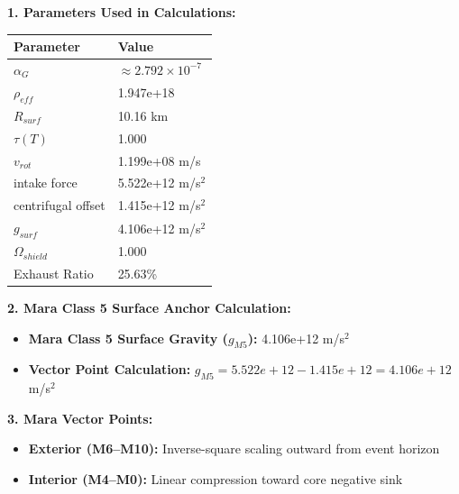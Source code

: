 \documentclass[11pt, a4paper]{article}
\begin{document}
\vspace{0.5em}
\noindent \textbf{1. Parameters Used in Calculations:}
\begin{center}
  \begin{tabular}{|l|l|}
    \hline
    \textbf{Parameter} & \textbf{Value} \\ \hline
    $\alpha_G$ & $\approx 2.792 \times 10^{-7}$ \\ \hline
    $\rho_{eff}$ & 1.947e+18 \\ \hline
    $R_{surf}$ & 10.16 km \\ \hline
    $\tau(T)$ & 1.000 \\ \hline
    $v_{rot}$ & 1.199e+08 m/s \\ \hline
    intake force & 5.522e+12 m/s$^2$ \\ \hline
    centrifugal offset & 1.415e+12 m/s$^2$ \\ \hline
    $g_{surf}$ & 4.106e+12 m/s$^2$ \\ \hline
    $\Omega_{shield}$ & 1.000 \\ \hline
    Exhaust Ratio & 25.63\% \\ \hline
  \end{tabular}
\end{center}

\vspace{0.5em}
\noindent \textbf{2. Mara Class 5 Surface Anchor Calculation:}
\begin{itemize}
  \item \textbf{Mara Class 5 Surface Gravity ($g_{M5}$):} 4.106e+12 m/s$^2$
  \item \textbf{Vector Point Calculation:} $g_{M5} = 5.522e+12 - 1.415e+12 = 4.106e+12$ m/s$^2$
\end{itemize}

\vspace{0.5em}
\noindent \textbf{3. Mara Vector Points:}
\begin{itemize}
  \item \textbf{Exterior (M6--M10):} Inverse-square scaling outward from event horizon
  \item \textbf{Interior (M4--M0):} Linear compression toward core negative sink
\end{itemize}
\end{document}
